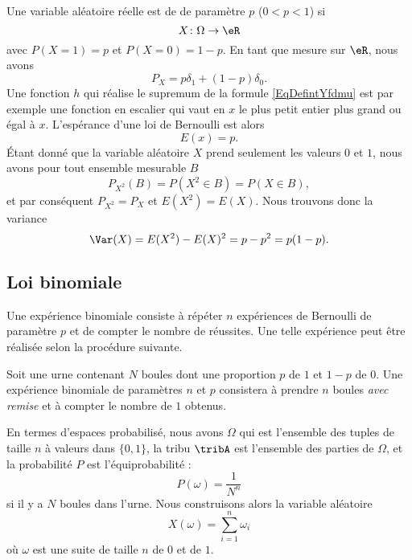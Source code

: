 Une variable aléatoire réelle est de  de paramètre \( p\) (\( 0<p<1\)) si
\begin{equation}
	X\colon \Omega\to \eR
\end{equation}
avec \( P(X=1)=p\) et \( P(X=0)=1-p\). En tant que mesure sur \( \eR\), nous avons
\begin{equation}
	P_X=p\delta_1+(1-p)\delta_0.
\end{equation}
Une fonction \( h\) qui réalise le supremum de la formule \eqref{EqDefintYfdmu} est par exemple une fonction en escalier qui vaut en \( x\) le plus petit entier plus grand ou égal à \( x\). L'espérance d'une loi de Bernoulli est alors
\begin{equation}
	E(x)=p.
\end{equation}
Étant donné que la variable aléatoire \( X\) prend seulement les valeurs \( 0\) et \( 1\), nous avons pour tout ensemble mesurable \( B\)
\begin{equation}
	P_{X^2}(B)=P(X^2\in B)=P(X\in B),
\end{equation}
et par conséquent \( P_{X^2}=P_X\) et \( E(X^2)=E(X)\). Nous trouvons donc la variance
\begin{equation}        \label{EqVarBern}
	\Var(X)=E(X^2)-E(X)^2=p-p^2=p(1-p).
\end{equation}

\subsection{Loi binomiale}

Une expérience binomiale consiste à répéter \( n\) expériences de Bernoulli de paramètre \( p\) et de compter le nombre de réussites. Une telle expérience peut être réalisée selon la procédure suivante.

Soit une urne contenant \( N\) boules dont une proportion \( p\) de \( 1\) et \( 1-p\) de \( 0\). Une expérience binomiale de paramètres \( n\) et \( p\) consistera à prendre \( n\) boules \emph{avec remise} et à compter le nombre de \( 1\) obtenus.

En termes d'espaces probabilisé, nous avons \( \Omega\) qui est l'ensemble des tuples de taille \( n\) à valeurs dans \( \{ 0,1 \}\), la tribu \( \tribA\) est l'ensemble des parties de \( \Omega\), et la probabilité \( P\) est l'équiprobabilité :
\begin{equation}
	P(\omega)=\frac{1}{ N^n }
\end{equation}
si il y a \( N\) boules dans l'urne. Nous construisons alors la variable aléatoire
\begin{equation}
	X(\omega)=\sum_{i=1}^n\omega_i
\end{equation}
où \( \omega\) est une suite de taille \( n\) de \( 0\) et de \( 1\).

